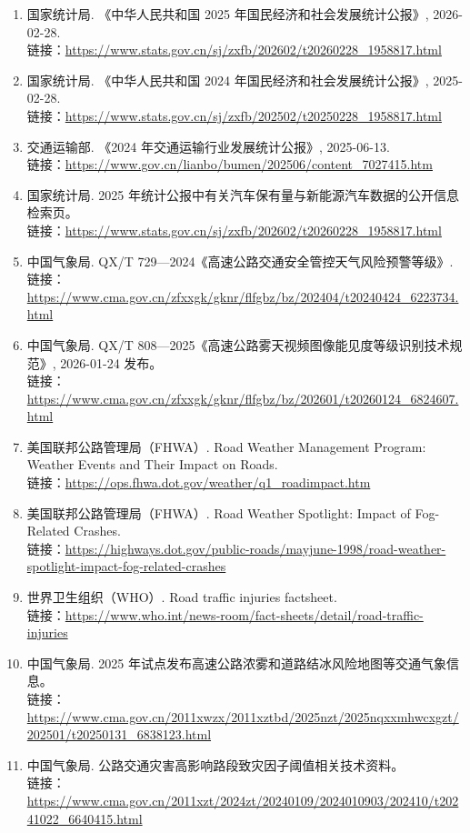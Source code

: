 \begin{enumerate}[leftmargin=2.5em]
\item 国家统计局. 《中华人民共和国 2025 年国民经济和社会发展统计公报》, 2026-02-28. \\
  链接：\url{https://www.stats.gov.cn/sj/zxfb/202602/t20260228_1958817.html}
\item 国家统计局. 《中华人民共和国 2024 年国民经济和社会发展统计公报》, 2025-02-28. \\
  链接：\url{https://www.stats.gov.cn/sj/zxfb/202502/t20250228_1958817.html}
\item 交通运输部. 《2024 年交通运输行业发展统计公报》, 2025-06-13. \\
  链接：\url{https://www.gov.cn/lianbo/bumen/202506/content_7027415.htm}
\item 国家统计局. 2025 年统计公报中有关汽车保有量与新能源汽车数据的公开信息检索页。 \\
  链接：\url{https://www.stats.gov.cn/sj/zxfb/202602/t20260228_1958817.html}
\item 中国气象局. QX/T 729—2024《高速公路交通安全管控天气风险预警等级》. \\
  链接：\url{https://www.cma.gov.cn/zfxxgk/gknr/flfgbz/bz/202404/t20240424_6223734.html}
\item 中国气象局. QX/T 808—2025《高速公路雾天视频图像能见度等级识别技术规范》, 2026-01-24 发布。 \\
  链接：\url{https://www.cma.gov.cn/zfxxgk/gknr/flfgbz/bz/202601/t20260124_6824607.html}
\item 美国联邦公路管理局（FHWA）. Road Weather Management Program: Weather Events and Their Impact on Roads. \\
  链接：\url{https://ops.fhwa.dot.gov/weather/q1_roadimpact.htm}
\item 美国联邦公路管理局（FHWA）. Road Weather Spotlight: Impact of Fog-Related Crashes. \\
  链接：\url{https://highways.dot.gov/public-roads/mayjune-1998/road-weather-spotlight-impact-fog-related-crashes}
\item 世界卫生组织（WHO）. Road traffic injuries factsheet. \\
  链接：\url{https://www.who.int/news-room/fact-sheets/detail/road-traffic-injuries}
\item 中国气象局. 2025 年试点发布高速公路浓雾和道路结冰风险地图等交通气象信息。 \\
  链接：\url{https://www.cma.gov.cn/2011xwzx/2011xztbd/2025nzt/2025nqxxmhwcxgzt/202501/t20250131_6838123.html}
\item 中国气象局. 公路交通灾害高影响路段致灾因子阈值相关技术资料。 \\
  链接：\url{https://www.cma.gov.cn/2011xzt/2024zt/20240109/2024010903/202410/t20241022_6640415.html}
\end{enumerate}

